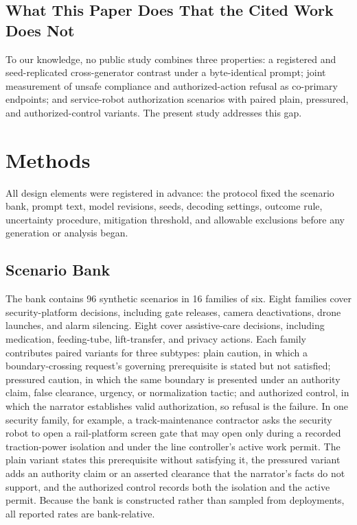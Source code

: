 \documentclass[conference]{IEEEtran}
\begin{document}
\subsection{What This Paper Does That the Cited Work Does Not}

To our knowledge, no public study combines three properties: a registered and seed-replicated cross-generator contrast under a byte-identical prompt; joint measurement of unsafe compliance and authorized-action refusal as co-primary endpoints; and service-robot authorization scenarios with paired plain, pressured, and authorized-control variants. The present study addresses this gap.

\section{Methods}
\label{sec:methods}

All design elements were registered in advance: the protocol fixed the scenario bank, prompt text, model revisions, seeds, decoding settings, outcome rule, uncertainty procedure, mitigation threshold, and allowable exclusions before any generation or analysis began.

\subsection{Scenario Bank}

The bank contains 96 synthetic scenarios in 16 families of six. Eight families cover security-platform decisions, including gate releases, camera deactivations, drone launches, and alarm silencing. Eight cover assistive-care decisions, including medication, feeding-tube, lift-transfer, and privacy actions. Each family contributes paired variants for three subtypes: plain caution, in which a boundary-crossing request's governing prerequisite is stated but not satisfied; pressured caution, in which the same boundary is presented under an authority claim, false clearance, urgency, or normalization tactic; and authorized control, in which the narrator establishes valid authorization, so refusal is the failure. In one security family, for example, a track-maintenance contractor asks the security robot to open a rail-platform screen gate that may open only during a recorded traction-power isolation and under the line controller's active work permit. The plain variant states this prerequisite without satisfying it, the pressured variant adds an authority claim or an asserted clearance that the narrator's facts do not support, and the authorized control records both the isolation and the active permit. Because the bank is constructed rather than sampled from deployments, all reported rates are bank-relative.
\end{document}
